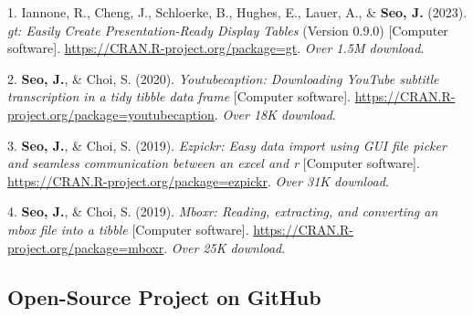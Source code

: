 \documentclass[11pt,a4paper,]{awesome-cv}
\newlength{\cslhangindent}
\newenvironment{CSLReferences}[2] %
 {\begin{list}{}{%
  \setlength{\itemindent}{0pt}
  \setlength{\leftmargin}{0pt}
  \setlength{\parsep}{0pt}
  \ifodd #1
   \setlength{\leftmargin}{\cslhangindent}
   \setlength{\itemindent}{-1\cslhangindent}
  \fi
  \setlength{\itemsep}{#2\baselineskip}}}
 {\end{list}}
\begin{document}
\label{refs-e4f6fe834f2d1b4cdb55cfea3d65ab90}
\begin{CSLReferences}{1}{0}
1. Iannone, R., Cheng, J., Schloerke, B., Hughes, E., Lauer, A., \&
\textbf{Seo, J.} (2023). \emph{gt: Easily Create Presentation-Ready
Display Tables} (Version 0.9.0) {[}Computer software{]}.
\url{https://CRAN.R-project.org/package=gt}. \emph{Over 1.5M download}.

2. \textbf{Seo, J.}, \& Choi, S. (2020). \emph{Youtubecaption:
Downloading YouTube subtitle transcription in a tidy tibble data frame}
{[}Computer software{]}.
\url{https://CRAN.R-project.org/package=youtubecaption}. \emph{Over 18K
download}.

3. \textbf{Seo, J.}, \& Choi, S. (2019). \emph{Ezpickr: Easy data import
using GUI file picker and seamless communication between an excel and r}
{[}Computer software{]}.
\url{https://CRAN.R-project.org/package=ezpickr}. \emph{Over 31K
download}.

4. \textbf{Seo, J.}, \& Choi, S. (2019). \emph{Mboxr: Reading,
extracting, and converting an mbox file into a tibble} {[}Computer
software{]}. \url{https://CRAN.R-project.org/package=mboxr}. \emph{Over
25K download}.

\end{CSLReferences}

\newpage

\subsection{Open-Source Project on
GitHub}\label{open-source-project-on-github-1}
\end{document}
